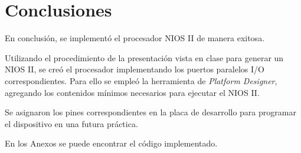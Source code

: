\section{Conclusiones}
En conclusión, se implementó el procesador NIOS II de manera exitosa.

Utilizando el procedimiento de la presentación vista en clase para generar un NIOS II, se creó el procesador implementando los puertos paralelos I/O correspondientes. Para ello se empleó la herramienta de \textit{Platform Designer}, agregando los contenidos mínimos necesarios para ejecutar el NIOS II.

Se asignaron los pines correspondientes en la placa de desarrollo para programar el dispositivo en una futura práctica.

En los Anexos se puede encontrar el código implementado.
